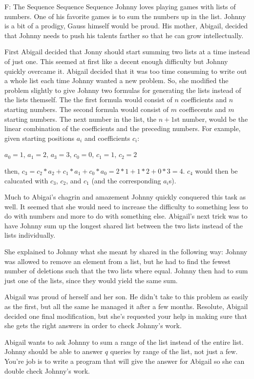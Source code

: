 \begin{problem}{F: The Sequence Sequence Sequence}
Johnny loves playing games with lists of numbers.
One of his favorite games is to sum the numbers up in the list.
Johnny is a bit of a prodigy, Gauss himself would be proud.
His mother, Abigail, decided that Johnny needs to push his talents farther so that he can grow intellectually.

First Abigail decided that Jonny should start summing two lists at a time instead of just one.
This seemed at first like a decent enough difficulty but Johnny quickly overcame it.
Abigail decided that it was too time consuming to write out a whole list each time Johnny wanted a new problem.
So, she modified the problem slightly to give Johnny two formulas for generating the lists instead of the lists themself.
The the first formula would consist of $n$ coefficients and $n$ starting numbers.
The second formula would consist of $m$ coeffiecents and $m$ starting numbers.
The next number in the list, the $n+1$st number, would be the linear combination of the coefficients and the preceding numbers.
For example, given starting positions $a_i$ and coefficients $c_i$:

$a_0 = 1$, $a_1 = 2$, $a_3 = 3$, $c_0 = 0$, $c_1 = 1$, $c_2 = 2$

then, $c_3 = c_2*a_2 + c_1*a_1 + c_0*a_0 = 2*1 + 1*2 + 0*3 = 4$.
$c_4$ would then be calucated with $c_3$, $c_2$, and $c_1$ (and the corresponding $a_i$s).

Much to Abigai's chagrin and amazement Johnny quickly conquered this task as well.
It seemed that she would need to increase the difficulty to something less to do with numbers and more to do with something else.
Abigail's next trick was to have Johnny sum up the longest shared list between the two lists instead of the lists individually.

She explained to Johnny what she meant by shared in the following way:
Johnny was allowed to remove an element from a list, but he had to find the fewest number of deletions such that the two lists where equal.
Johnny then had to sum just one of the lists, since they would yield the same sum.

Abigail was proud of herself and her son.
He didn't take to this problem as easily as the first, but all the same he managed it after a few months.
Resolute, Abigail decided one final modification, but she's requested your help in making sure that she gets the right answers in order to check Johnny's work.

Abigail wants to ask Johnny to sum a range of the list instead of the entire list.
Johnny should be able to answer $q$ queries by range of the list, not just a few.
You're job is to write a program that will give the answer for Abigail so she can double check Johnny's work.
\end{problem}

